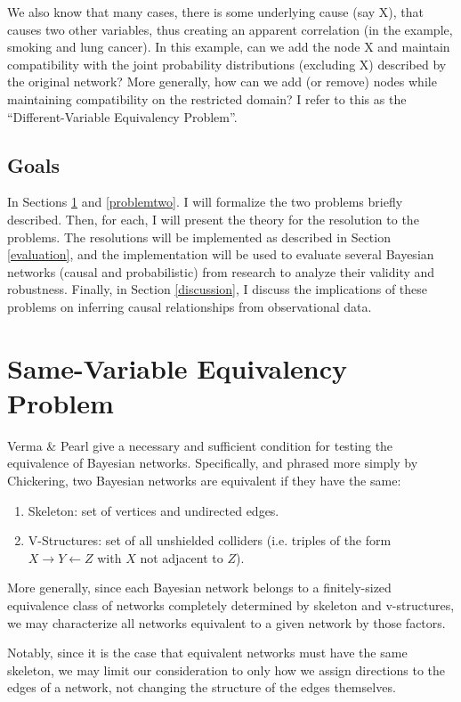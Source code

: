 \documentclass{article}
\newcommand{\problemone}{Same-Variable Equivalency Problem}
\newcommand{\problemtwo}{Different-Variable Equivalency Problem}
\begin{document}
	We also know that many cases, there is some underlying cause (say X), that causes two other variables, thus creating an apparent correlation (in the example, smoking and lung cancer). In this example, can we add the node X and maintain compatibility with the joint probability distributions (excluding X) described by the original network? More generally, how can we add (or remove) nodes while maintaining compatibility on the restricted domain? I refer to this as the ``\problemtwo''.
	
	\subsection{Goals}
	In Sections \ref{problemone} and \ref{problemtwo}. I will formalize the two problems briefly described.
	Then, for each, I will present the theory for the resolution to the problems.
	The resolutions will be implemented as described in Section \ref{evaluation}, and the implementation will be used to evaluate several Bayesian networks (causal and probabilistic) from research to analyze their validity and robustness.
	Finally, in Section \ref{discussion}, I discuss the implications of these problems on inferring causal relationships from observational data.


	\section{\problemone}
	\label{problemone}
	
	Verma \& Pearl\cite{verma2013equivalence} give a necessary and sufficient condition for testing the equivalence of Bayesian networks.
	Specifically, and phrased more simply by Chickering\cite{chickering2013transformational}, two Bayesian networks are equivalent if they have the same:
	\begin{enumerate}
		\item Skeleton: set of vertices and undirected edges.
		\item V-Structures: set of all unshielded colliders (i.e. triples of the form $X \rightarrow Y \leftarrow Z$ with $X$ not adjacent to $Z$).
	\end{enumerate}
	More generally, since each Bayesian network belongs to a finitely-sized equivalence class of networks completely determined by skeleton and v-structures, we may characterize all networks equivalent to a given network by those factors.
	
	Notably, since it is the case that equivalent networks must have the same skeleton, we may limit our consideration to only how we assign directions to the edges of a network, not changing the structure of the edges themselves.
	
\end{document}
